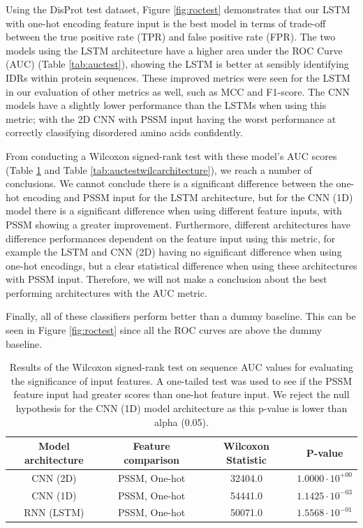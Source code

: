 \documentclass{l4proj}
\begin{document}
Using the DisProt test dataset, Figure \ref{fig:roctest} demonstrates that our LSTM with one-hot encoding feature input is the best model in terms of trade-off between the true positive rate (TPR) and false positive rate (FPR). The two models using the LSTM architecture have a higher area under the ROC Curve (AUC) (Table \ref{tab:auctest}), showing the LSTM is better at sensibly identifying IDRs within protein sequences. These improved metrics were seen for the LSTM in our evaluation of other metrics as well, such as MCC and F1-score. The CNN models have a slightly lower performance than the LSTMs when using this metric; with the 2D CNN with PSSM input having the worst performance at correctly classifying disordered amino acids confidently. 

From conducting a Wilcoxon signed-rank test with these model's AUC scores (Table \ref{tab:auctestwilcinput} and Table \ref{tab:auctestwilcarchitecture}), we reach a number of conclusions. We cannot conclude there is a significant difference between the one-hot encoding and PSSM input for the LSTM architecture, but for the CNN (1D) model there is a significant difference when using different feature inputs, with PSSM showing a greater improvement. Furthermore, different architectures have difference performances dependent on the feature input using this metric, for example the LSTM and CNN (2D) having no significant difference when using one-hot encodings, but a clear statistical difference when using these architectures with PSSM input. Therefore, we will not make a conclusion about the best performing architectures with the AUC metric.

Finally, all of these classifiers perform better than a dummy baseline. This can be seen in Figure \ref{fig:roctest} since all the ROC curves are above the dummy baseline.

\begin{table}[!htb]
    \centering
    \caption{Results of the Wilcoxon signed-rank test on sequence AUC values for evaluating the significance of input features. A one-tailed test was used to see if the PSSM feature input had greater scores than one-hot feature input. We reject the null hypothesis for the CNN (1D) model architecture as this p-value is lower than alpha (0.05).}
    \begin{tabular}{@{}cccc@{}}
    \toprule
    Model architecture & Feature comparison & Wilcoxon Statistic & P-value \\ \midrule
    CNN (2D) & PSSM, One-hot & 32404.0 & $1.0000\cdot{10^{+00}}$ \\
    CNN (1D) & PSSM, One-hot & 54441.0 & $1.1425\cdot{10^{-03}}$ \\
    RNN (LSTM) & PSSM, One-hot & 50071.0 & $1.5568\cdot{10^{-01}}$ \\ \bottomrule
    \end{tabular}
    
    \label{tab:auctestwilcinput}
\end{table}
\end{document}
